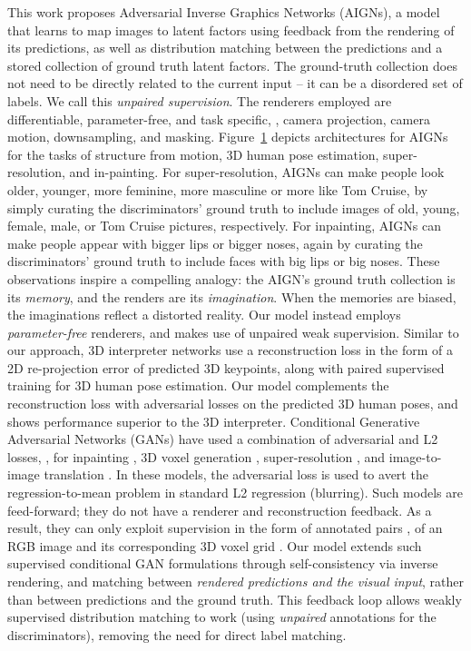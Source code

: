 \documentclass[10pt,twocolumn,letterpaper]{article}
\begin{document}
\begin{bibunit}[ieee]
\begin{figure}[t!]
\label{fig:framework}
\end{figure}This work proposes Adversarial Inverse Graphics Networks (AIGNs),  a model that learns to map images to latent factors using feedback from the rendering of its predictions, as well as distribution matching between the predictions and a stored collection of ground truth latent factors. 
The ground-truth collection does not need to be directly related to the current input -- it can be a disordered set of labels. We call this \textit{unpaired supervision}. The renderers employed are differentiable, parameter-free, and task specific, \eg, camera projection, camera motion, downsampling, and masking. 
Figure~\ref{fig:framework} depicts architectures for AIGNs for the tasks of structure from motion, 3D human pose estimation, super-resolution, and in-painting. 
For super-resolution, AIGNs can make people look older, younger, more feminine, more masculine or more like Tom Cruise, by simply curating the discriminators' ground truth to include images of old, young, female, male, or Tom Cruise pictures, respectively. 
For inpainting, AIGNs can make people appear with bigger lips or bigger noses, %
again by curating the discriminators' ground truth to include faces with big lips or big noses. These observations inspire a compelling analogy: the AIGN's ground truth collection is its \textit{memory}, and the renders are its \textit{imagination}. When the memories are biased, the imaginations reflect a distorted reality.
Our model instead employs \textit{parameter-free} renderers, and makes use of unpaired weak supervision. 
Similar to our approach, 3D interpreter networks \cite{Wu2016} use a reconstruction loss in the form of a 2D re-projection error of predicted 3D keypoints, along with paired  supervised training for 3D human pose estimation.  
Our model complements the reconstruction loss with adversarial losses on the predicted 3D human poses, and shows performance superior to the 3D interpreter. 
Conditional Generative Adversarial Networks (GANs) have used a combination of adversarial and L2 losses, \eg, for  inpainting \cite{pathakCVPR16context}, 3D voxel generation \cite{3dgan},  super-resolution \cite{DBLP:journals/corr/DongLHT15}, and image-to-image translation \cite{DBLP:journals/corr/IsolaZZE16}. In these models, the adversarial loss is used to avert the regression-to-mean problem in standard L2 regression (\ie blurring). 
Such models are feed-forward; they do not have a renderer and reconstruction feedback. 
As a result, they can only exploit supervision in the form of annotated pairs \eg, of an RGB image and its corresponding 3D voxel grid \cite{3dgan}. 
Our model extends such supervised conditional GAN formulations through  self-consistency via inverse rendering, and matching  between \textit{rendered predictions and the visual input}, rather than between predictions and the ground truth. This feedback loop allows weakly supervised distribution matching to work (using \textit{unpaired} annotations for the discriminators), removing the need for direct label matching. 


\end{bibunit}
\end{document}
